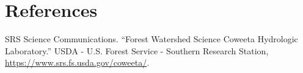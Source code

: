 \documentclass[
  12pt,
]{article}
\begin{document}
\newpage

\hypertarget{references}{%
\section{References}\label{references}}

SRS Science Communications. ``Forest Watershed Science Coweeta
Hydrologic Laboratory.'' USDA - U.S. Forest Service - Southern Research
Station, \url{https://www.srs.fs.usda.gov/coweeta/}.
\end{document}
